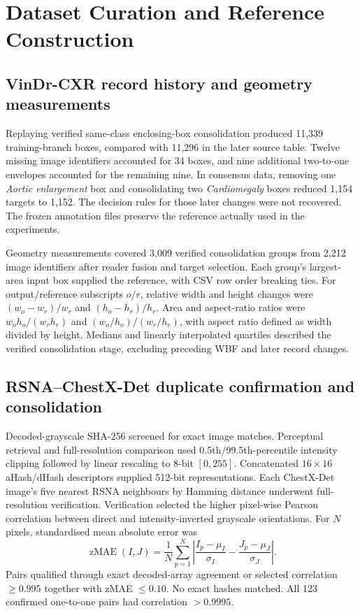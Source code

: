 \section{Dataset Curation and Reference Construction}
\label{app:data-curation}

\subsection{VinDr-CXR record history and geometry measurements}

Replaying verified same-class enclosing-box consolidation produced 11,339 training-branch boxes, compared with 11,296 in the later source table. Twelve missing image identifiers accounted for 34 boxes, and nine additional two-to-one envelopes accounted for the remaining nine. In consensus data, removing one \textit{Aortic enlargement} box and consolidating two \textit{Cardiomegaly} boxes reduced 1,154 targets to 1,152. The decision rules for those later changes were not recovered. The frozen annotation files preserve the reference actually used in the experiments.

Geometry measurements covered 3,009 verified consolidation groups from 2,212 image identifiers after reader fusion and target selection. Each group's largest-area input box supplied the reference, with CSV row order breaking ties. For output/reference subscripts $o/r$, relative width and height changes were $(w_o-w_r)/w_r$ and $(h_o-h_r)/h_r$. Area and aspect-ratio ratios were $w_oh_o/(w_rh_r)$ and $(w_o/h_o)/(w_r/h_r)$, with aspect ratio defined as width divided by height. Medians and linearly interpolated quartiles described the verified consolidation stage, excluding preceding WBF and later record changes.

\subsection{RSNA--ChestX-Det duplicate confirmation and consolidation}

Decoded-grayscale SHA-256 screened for exact image matches. Perceptual retrieval and full-resolution comparison used 0.5th/99.5th-percentile intensity clipping followed by linear rescaling to 8-bit $[0,255]$. Concatenated $16\times16$ aHash/dHash descriptors supplied 512-bit representations. Each ChestX-Det image's five nearest RSNA neighbours by Hamming distance underwent full-resolution verification. Verification selected the higher pixel-wise Pearson correlation between direct and intensity-inverted grayscale orientations. For $N$ pixels, standardised mean absolute error was
\[
\operatorname{zMAE}(I,J)=\frac{1}{N}\sum_{p=1}^{N}\left|\frac{I_p-\mu_I}{\sigma_I}-\frac{J_p-\mu_J}{\sigma_J}\right|.
\]
Pairs qualified through exact decoded-array agreement or selected correlation $\geq0.995$ together with zMAE $\leq0.10$. No exact hashes matched. All 123 confirmed one-to-one pairs had correlation $>0.9995$.

